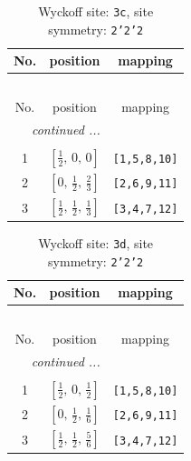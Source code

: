 \documentclass[fleqn,8pt]{jsarticle}
\begin{document}
\renewcommand{\arraystretch}{1.2}
\begin{longtable}{ccc}
\caption{Wyckoff site: {\tt 3c}, site symmetry: {\tt 2'2'2}}
 \\
 \hline \hline
No. & position & mapping \\ \hline \endfirsthead

\multicolumn{2}{l}{\tablename\ \thetable{}} \\
 \hline \hline
No. & position & mapping \\ \hline \endhead

 \hline \hline
\multicolumn{2}{r}{\footnotesize\it continued ...} \\ \endfoot

 \hline \hline
\multicolumn{2}{r}{} \\ \endlastfoot

1 & $\left[ \frac{1}{2},\, 0,\, 0 \right]$ & {\tt [1,5,8,10]} \\ \hline
2 & $\left[ 0,\, \frac{1}{2},\, \frac{2}{3} \right]$ & {\tt [2,6,9,11]} \\ \hline
3 & $\left[ \frac{1}{2},\, \frac{1}{2},\, \frac{1}{3} \right]$ & {\tt [3,4,7,12]} \\
\end{longtable}
\renewcommand{\arraystretch}{1.2}
\begin{longtable}{ccc}
\caption{Wyckoff site: {\tt 3d}, site symmetry: {\tt 2'2'2}}
 \\
 \hline \hline
No. & position & mapping \\ \hline \endfirsthead

\multicolumn{2}{l}{\tablename\ \thetable{}} \\
 \hline \hline
No. & position & mapping \\ \hline \endhead

 \hline \hline
\multicolumn{2}{r}{\footnotesize\it continued ...} \\ \endfoot

 \hline \hline
\multicolumn{2}{r}{} \\ \endlastfoot

1 & $\left[ \frac{1}{2},\, 0,\, \frac{1}{2} \right]$ & {\tt [1,5,8,10]} \\ \hline
2 & $\left[ 0,\, \frac{1}{2},\, \frac{1}{6} \right]$ & {\tt [2,6,9,11]} \\ \hline
3 & $\left[ \frac{1}{2},\, \frac{1}{2},\, \frac{5}{6} \right]$ & {\tt [3,4,7,12]} \\
\end{longtable}
\renewcommand{\arraystretch}{1.2}
\end{document}
